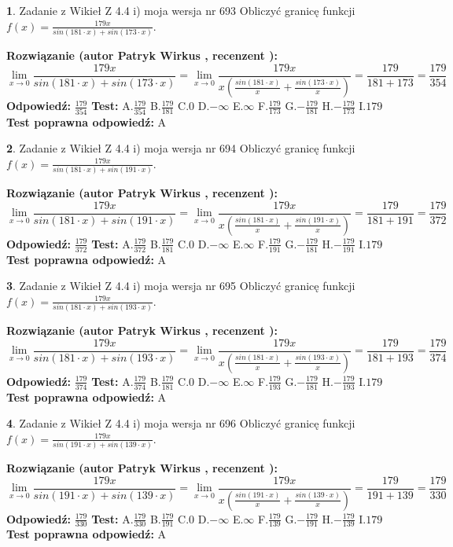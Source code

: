 \documentclass[12pt, a4paper]{article}
\theoremstyle{definition} %
\newtheorem{zad}{}
\newcommand{\zadStart}[1]{\begin{zad}#1\newline}
\newcommand{\zadStop}{\end{zad}}
\newcommand{\rozwStart}[2]{\noindent \textbf{Rozwiązanie (autor #1 , recenzent #2): }\newline}
\newcommand{\rozwStop}{\newline}
\newcommand{\odpStart}{\noindent \textbf{Odpowiedź:}\newline}
\newcommand{\odpStop}{\newline}
\newcommand{\testStart}{\noindent \textbf{Test:}\newline}
\newcommand{\testStop}{\newline}
\newcommand{\kluczStart}{\noindent \textbf{Test poprawna odpowiedź:}\newline}
\newcommand{\kluczStop}{\newline}
\begin{document}
\zadStart{Zadanie z Wikieł Z 4.4 i) moja wersja nr 693}
Obliczyć granicę funkcji $f(x)=\frac{179x}{sin(181\cdot x) +sin(173\cdot x)}$.
\zadStop
\rozwStart{Patryk Wirkus}{}
$$\lim\limits_{x\to 0}\frac{179x}{sin(181\cdot x) +sin(173\cdot x)}=\lim\limits_{x\to 0}\frac{179x}{x(\frac{sin(181\cdot x)}{x}+\frac{sin(173\cdot x)}{x})}=\frac{179}{181+173} = \frac{179}{354}$$
\rozwStop
\odpStart
$\frac{179}{354}$
\odpStop
\testStart
A.$\frac{179}{354}$
B.$\frac{179}{181}$
C.$0$
D.$-\infty$
E.$\infty$
F.$\frac{179}{173}$
G.$-\frac{179}{181}$
H.$-\frac{179}{173}$
I.$179$
\testStop
\kluczStart
A
\kluczStop



\zadStart{Zadanie z Wikieł Z 4.4 i) moja wersja nr 694}
Obliczyć granicę funkcji $f(x)=\frac{179x}{sin(181\cdot x) +sin(191\cdot x)}$.
\zadStop
\rozwStart{Patryk Wirkus}{}
$$\lim\limits_{x\to 0}\frac{179x}{sin(181\cdot x) +sin(191\cdot x)}=\lim\limits_{x\to 0}\frac{179x}{x(\frac{sin(181\cdot x)}{x}+\frac{sin(191\cdot x)}{x})}=\frac{179}{181+191} = \frac{179}{372}$$
\rozwStop
\odpStart
$\frac{179}{372}$
\odpStop
\testStart
A.$\frac{179}{372}$
B.$\frac{179}{181}$
C.$0$
D.$-\infty$
E.$\infty$
F.$\frac{179}{191}$
G.$-\frac{179}{181}$
H.$-\frac{179}{191}$
I.$179$
\testStop
\kluczStart
A
\kluczStop



\zadStart{Zadanie z Wikieł Z 4.4 i) moja wersja nr 695}
Obliczyć granicę funkcji $f(x)=\frac{179x}{sin(181\cdot x) +sin(193\cdot x)}$.
\zadStop
\rozwStart{Patryk Wirkus}{}
$$\lim\limits_{x\to 0}\frac{179x}{sin(181\cdot x) +sin(193\cdot x)}=\lim\limits_{x\to 0}\frac{179x}{x(\frac{sin(181\cdot x)}{x}+\frac{sin(193\cdot x)}{x})}=\frac{179}{181+193} = \frac{179}{374}$$
\rozwStop
\odpStart
$\frac{179}{374}$
\odpStop
\testStart
A.$\frac{179}{374}$
B.$\frac{179}{181}$
C.$0$
D.$-\infty$
E.$\infty$
F.$\frac{179}{193}$
G.$-\frac{179}{181}$
H.$-\frac{179}{193}$
I.$179$
\testStop
\kluczStart
A
\kluczStop



\zadStart{Zadanie z Wikieł Z 4.4 i) moja wersja nr 696}
Obliczyć granicę funkcji $f(x)=\frac{179x}{sin(191\cdot x) +sin(139\cdot x)}$.
\zadStop
\rozwStart{Patryk Wirkus}{}
$$\lim\limits_{x\to 0}\frac{179x}{sin(191\cdot x) +sin(139\cdot x)}=\lim\limits_{x\to 0}\frac{179x}{x(\frac{sin(191\cdot x)}{x}+\frac{sin(139\cdot x)}{x})}=\frac{179}{191+139} = \frac{179}{330}$$
\rozwStop
\odpStart
$\frac{179}{330}$
\odpStop
\testStart
A.$\frac{179}{330}$
B.$\frac{179}{191}$
C.$0$
D.$-\infty$
E.$\infty$
F.$\frac{179}{139}$
G.$-\frac{179}{191}$
H.$-\frac{179}{139}$
I.$179$
\testStop
\kluczStart
A
\kluczStop
\end{document}
